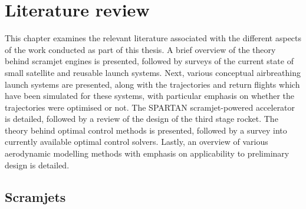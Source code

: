 
\cleardoublepage
\chapter{Literature review}\label{chapter:literature-review}


  This chapter examines the relevant literature associated with the different aspects of the work conducted as part of this thesis. A brief overview of the theory behind scramjet engines is presented, followed by surveys of the current state of small satellite and reusable launch systems. Next, various conceptual airbreathing launch systems are presented, along with the trajectories and return flights which have been simulated for these systems, with particular emphasis on whether the trajectories were optimised or not. The SPARTAN scramjet-powered accelerator is detailed, followed by a review of the design of the third stage rocket. The theory behind optimal control methods is presented, followed by a survey into currently available optimal control solvers.
  Lastly, an overview of various aerodynamic modelling methods with emphasis on applicability to preliminary design is detailed. 
  
  
 
  
  
  
  
  
  \section{Scramjets}
 

  
  
 
  
